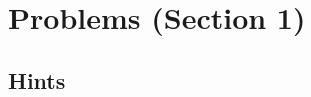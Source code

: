 

\pagestyle{fancy}%
\fancyhead[L]{\textsc{\rightmark}}%
\fancyhead[C]{}%
\fancyhead[R]{\thepage}
\fancyfoot{}%
\renewcommand{\contentsname}{Contents}%


\tableofcontents
\vspace{10em}
\hrulefill\\


\section{Problems (Section 1)}

\subsection{Hints}





